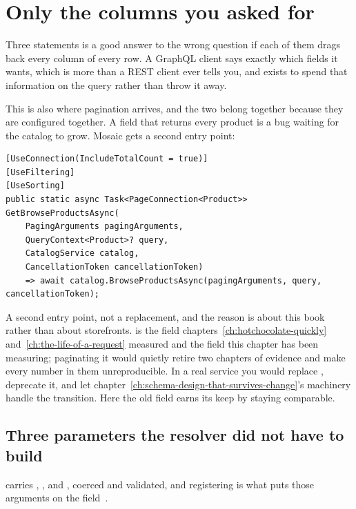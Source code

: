 \section{Only the columns you asked for}
\label{sec:ch04-only-the-columns}

Three statements is a good answer to the wrong question if each of them drags
back every column of every row. A GraphQL client says exactly which fields it
wants, which is more than a REST client ever tells you, and 
exists to spend that information on the query rather than throw it away.

%
This is also where pagination arrives, and the two belong together because they
are configured together. A field that returns every product is a bug waiting for
the catalog to grow. Mosaic gets a second entry point:

\begin{verbatim}
[UseConnection(IncludeTotalCount = true)]
[UseFiltering]
[UseSorting]
public static async Task<PageConnection<Product>> GetBrowseProductsAsync(
    PagingArguments pagingArguments,
    QueryContext<Product>? query,
    CatalogService catalog,
    CancellationToken cancellationToken)
    => await catalog.BrowseProductsAsync(pagingArguments, query, cancellationToken);
\end{verbatim}

%
A second entry point, not a replacement, and the reason is about this book
rather than about storefronts.  is the field
chapters~\ref{ch:hotchocolate-quickly} and~\ref{ch:the-life-of-a-request}
measured and the field this chapter has been measuring; paginating it would
quietly retire two chapters of evidence and make every number in them
unreproducible. In a real service you would replace , deprecate
it, and let chapter~\ref{ch:schema-design-that-survives-change}'s machinery
handle the transition. Here the old field earns its keep by staying comparable.

\subsection*{Three parameters the resolver did not have to build}

%
 carries , ,  and
, coerced and validated, and registering
 is what puts those arguments on the
field~\autocite{chillicream2026pagination}.

